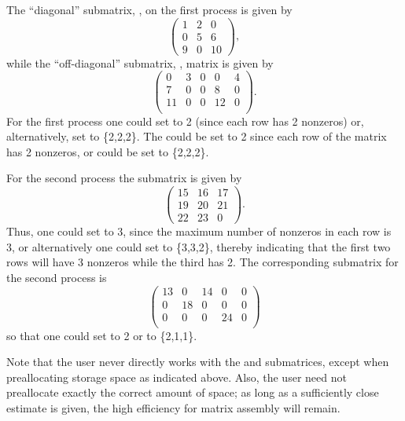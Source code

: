 The ``diagonal'' submatrix, , on the first process is given by
{\small
\[
\left( \begin{array}{ccc}
1  & 2  & 0  \\
0  & 5  & 6  \\
9  & 0  & 10
\end{array} \right),
\]
}
while the ``off-diagonal'' submatrix, , matrix is given by
{\small
\[
\left( \begin{array}{ccccc}
 0  & 3  & 0   & 0  & 4  \\
 7  & 0  & 0   & 8  & 0  \\
 11 & 0  & 0   & 12 & 0  \\
\end{array} \right).
\]
}
For the first process one could set  to 2 (since each
row has 2 nonzeros) or, alternatively, set  to \{2,2,2\}.
The  could be set to 2 since each row of the  matrix
has 2 nonzeros, or  could be set to \{2,2,2\}.

For the second process the  submatrix is given by
{\small
\[
\left( \begin{array}{cccccccccc}
 15 & 16 & 17 \\
 19 & 20 & 21 \\
 22 & 23 & 0
\end{array} \right) .
\]
}
Thus, one could set  to 3, since the maximum number of
nonzeros in each row is 3, or alternatively one could set  to
\{3,3,2\}, thereby indicating that the first two rows will have 3
nonzeros while the third has 2. The corresponding  submatrix for the
second process is
{\small
\[
\left( \begin{array}{cccccccccc}
13 & 0  & 14 &  0  & 0  \\
0  & 18 & 0  &  0  & 0 \\
0  & 0  & 0  &  24 & 0 \\
\end{array} \right)
\]
}
so that one could set  to 2 or  to \{2,1,1\}.

Note that the user never directly works with the  and 
submatrices, except when preallocating storage space as indicated above.
Also, the user need not preallocate exactly the correct amount of
space; as long as a sufficiently close estimate is given, the high
efficiency for matrix assembly will remain.


